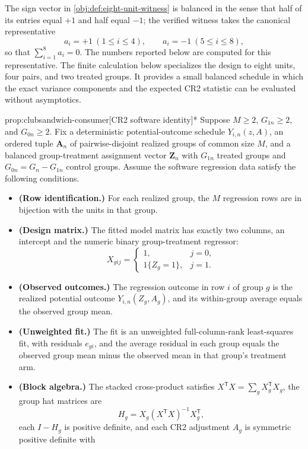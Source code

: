 \documentclass[11pt]{article}
\begin{document}
The sign vector in \cref{obj:def:eight-unit-witness} is balanced in the sense that half of its entries equal \(+1\) and half equal \(-1\); the verified witness takes the canonical representative
\[
a_i=+1\ (1\le i\le 4),
\qquad
a_i=-1\ (5\le i\le 8),
\]
so that \(\sum_{i=1}^{8}a_i=0\). The numbers reported below are computed for this representative. The finite calculation below specializes the design to eight units, four pairs, and two treated groups. It provides a small balanced schedule in which the exact variance components and the expected CR2 statistic can be evaluated without asymptotics.

\begin{propositionv}{prop:clubsandwich-consumer}[CR2 software identity]*
Suppose \(M\ge 2\), \(G_{1n}\ge 2\), and \(G_{0n}\ge 2\).  Fix a deterministic potential-outcome schedule \(Y_{i,n}(z,A)\), an ordered tuple \(\mathbf A_n\) of pairwise-disjoint realized groups of common size \(M\), and a balanced group-treatment assignment vector \(\mathbf Z_n\) with \(G_{1n}\) treated groups and \(G_{0n}=G_n-G_{1n}\) control groups.  Assume the software regression data satisfy the following conditions.
\begin{itemize}
\item \textbf{(Row identification.)} For each realized group, the \(M\) regression rows are in bijection with the units in that group.
\item \textbf{(Design matrix.)} The fitted model matrix has exactly two columns, an intercept and the numeric binary group-treatment regressor:
\[
X_{gij}
=
\begin{cases}
1, & j=0,\\
1\{Z_g=1\}, & j=1.
\end{cases}
\]
\item \textbf{(Observed outcomes.)} The regression outcome in row \(i\) of group \(g\) is the realized potential outcome \(Y_{i,n}(Z_g,A_g)\), and its within-group average equals the observed group mean.
\item \textbf{(Unweighted fit.)} The fit is an unweighted full-column-rank least-squares fit, with residuals \(e_{gi}\), and the average residual in each group equals the observed group mean minus the observed mean in that group's treatment arm.
\item \textbf{(Block algebra.)} The stacked cross-product satisfies \(X^{\mathsf T}X=\sum_g X_g^{\mathsf T}X_g\), the group hat matrices are
\[
H_g=X_g(X^{\mathsf T}X)^{-1}X_g^{\mathsf T},
\]
each \(I-H_g\) is positive definite, and each CR2 adjustment \(A_g\) is symmetric positive definite with

\end{itemize}
\end{propositionv}
\end{document}
